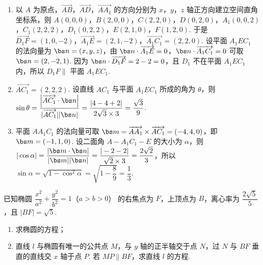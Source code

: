 \begin{solution}
\begin{enumerate}
\item 以 \(A\) 为原点，\(\overrightarrow{AB}\)，\(\overrightarrow{AD}\)，\(\overrightarrow{AA_1}\) 的方向分别为 \(x\)，\(y\)，\(z\) 轴正方向建立空间直角坐标系，则 \(A(0,0,0)\)，\(B(2,0,0)\)，\(C(2,2,0)\)，\(D(0,2,0)\)，\(A_1(0,0,2)\)，\(C_1(2,2,2)\)，\(D_1(0,2,2)\)，\(E(2,1,0)\)，\(F(1,2,0)\). 于是 \(\overrightarrow{D_1F}=(1,0,-2)\)，\(\overrightarrow{A_1E}=(2,1,-2)\)，\(\overrightarrow{A_1C_1}=(2,2,0)\). 设平面 \(A_1EC_1\) 的法向量为 \(\bs n=(x,y,z)\)，由 \(\bs n\cdot\overrightarrow{A_1E}=0\)，\(\bs n\cdot\overrightarrow{A_1C_1}=0\) 可取 \(\bs n=(2,-2,1)\). 因为 \(\bs n\cdot\overrightarrow{D_1F}=2-2=0\)，且 \(D_1\) 不在平面 \(A_1EC_1\) 内，所以 \(D_1F\parallel\) 平面 \(A_1EC_1\).

\item \(\overrightarrow{AC_1}=(2,2,2)\). 设直线 \(AC_1\) 与平面 \(A_1EC_1\) 所成的角为 \(\theta\)，则 \(\sin\theta=\dfrac{\left|\overrightarrow{AC_1}\cdot\bs n\right|}{|\overrightarrow{AC_1}||\bs n|}=\dfrac{|4-4+2|}{2\sqrt3\times3}=\dfrac{\sqrt3}9\).

\item 平面 \(AA_1C_1\) 的法向量可取 \(\bs m=\overrightarrow{AA_1}\times\overrightarrow{AC_1}=(-4,4,0)\)，即 \(\bs m=(-1,1,0)\). 设二面角 \(A-A_1C_1-E\) 的大小为 \(\alpha\)，则 \(|\cos\alpha|=\dfrac{|\bs m\cdot\bs n|}{|\bs m||\bs n|}=\dfrac{|-2-2|}{\sqrt2\times3}=\dfrac{2\sqrt2}3\)，所以 \(\sin\alpha=\sqrt{1-\cos^2\alpha}=\sqrt{1-\dfrac89}=\dfrac13\).
\end{enumerate}
\end{solution}

\begin{problem}
已知椭圆 \( \dfrac{x^2}{a^2}+\dfrac{y^2}{b^2}=1 \)（\(a>b>0\)） 的右焦点为 \(F\)，上顶点为 \(B\)，离心率为 \( \dfrac{2\sqrt5}{5} \)，且 \( |BF|=\sqrt5 \).

\begin{enumerate}
\item 求椭圆的方程；
\item 直线 \( l \) 与椭圆有唯一的公共点 \(M\)，与 \( y \) 轴的正半轴交于点 \(N\)，过 \(N\) 与 \(BF\) 垂直的直线交 \( x \) 轴于点 \(P\). 若 \( MP\parallel BF \)，求直线 \( l \) 的方程.
\end{enumerate}
\end{problem}

